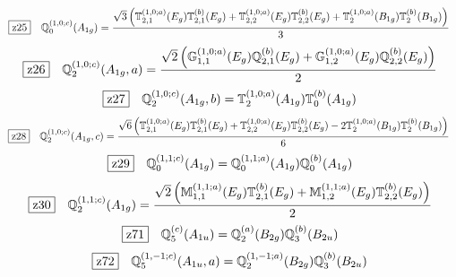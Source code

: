 \documentclass[fleqn,10pt,landscape]{jsarticle}
\begin{document}
\begin{dmath*}
\hspace*{3mm}\fbox{z25}\quad \mathbb{Q}_{0}^{(1,0;c)}(A_{1g})=\frac{\sqrt{3} \left(\mathbb{T}_{2,1}^{(1,0;a)}(E_{g}) \mathbb{T}_{2,1}^{(b)}(E_{g}) + \mathbb{T}_{2,2}^{(1,0;a)}(E_{g}) \mathbb{T}_{2,2}^{(b)}(E_{g}) + \mathbb{T}_{2}^{(1,0;a)}(B_{1g}) \mathbb{T}_{2}^{(b)}(B_{1g})\right)}{3}
\end{dmath*}
\begin{dmath*}
\hspace*{3mm}\fbox{z26}\quad \mathbb{Q}_{2}^{(1,0;c)}(A_{1g},a)=\frac{\sqrt{2} \left(\mathbb{G}_{1,1}^{(1,0;a)}(E_{g}) \mathbb{Q}_{2,1}^{(b)}(E_{g}) + \mathbb{G}_{1,2}^{(1,0;a)}(E_{g}) \mathbb{Q}_{2,2}^{(b)}(E_{g})\right)}{2}
\end{dmath*}
\begin{dmath*}
\hspace*{3mm}\fbox{z27}\quad \mathbb{Q}_{2}^{(1,0;c)}(A_{1g},b)=\mathbb{T}_{2}^{(1,0;a)}(A_{1g}) \mathbb{T}_{0}^{(b)}(A_{1g})
\end{dmath*}
\begin{dmath*}
\hspace*{3mm}\fbox{z28}\quad \mathbb{Q}_{2}^{(1,0;c)}(A_{1g},c)=\frac{\sqrt{6} \left(\mathbb{T}_{2,1}^{(1,0;a)}(E_{g}) \mathbb{T}_{2,1}^{(b)}(E_{g}) + \mathbb{T}_{2,2}^{(1,0;a)}(E_{g}) \mathbb{T}_{2,2}^{(b)}(E_{g}) - 2 \mathbb{T}_{2}^{(1,0;a)}(B_{1g}) \mathbb{T}_{2}^{(b)}(B_{1g})\right)}{6}
\end{dmath*}
\begin{dmath*}
\hspace*{3mm}\fbox{z29}\quad \mathbb{Q}_{0}^{(1,1;c)}(A_{1g})=\mathbb{Q}_{0}^{(1,1;a)}(A_{1g}) \mathbb{Q}_{0}^{(b)}(A_{1g})
\end{dmath*}
\begin{dmath*}
\hspace*{3mm}\fbox{z30}\quad \mathbb{Q}_{2}^{(1,1;c)}(A_{1g})=\frac{\sqrt{2} \left(\mathbb{M}_{1,1}^{(1,1;a)}(E_{g}) \mathbb{T}_{2,1}^{(b)}(E_{g}) + \mathbb{M}_{1,2}^{(1,1;a)}(E_{g}) \mathbb{T}_{2,2}^{(b)}(E_{g})\right)}{2}
\end{dmath*}
\begin{dmath*}
\hspace*{3mm}\fbox{z71}\quad \mathbb{Q}_{5}^{(c)}(A_{1u})=\mathbb{Q}_{2}^{(a)}(B_{2g}) \mathbb{Q}_{3}^{(b)}(B_{2u})
\end{dmath*}
\begin{dmath*}
\hspace*{3mm}\fbox{z72}\quad \mathbb{Q}_{5}^{(1,-1;c)}(A_{1u},a)=\mathbb{Q}_{2}^{(1,-1;a)}(B_{2g}) \mathbb{Q}_{3}^{(b)}(B_{2u})
\end{dmath*}
\end{document}
